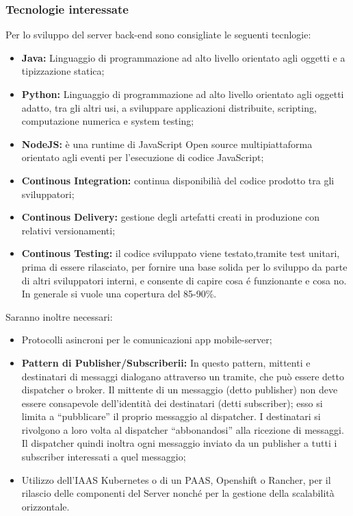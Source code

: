 	\subsubsection{Tecnologie interessate}
		Per lo sviluppo del server back-end sono consigliate le seguenti tecnlogie:
		\begin{itemize}
			\item \textbf{Java:} Linguaggio di programmazione ad alto livello orientato agli oggetti e a tipizzazione statica;
			\item \textbf{Python:} Linguaggio di programmazione ad alto livello orientato agli oggetti adatto, tra gli altri usi, a sviluppare applicazioni distribuite, scripting, computazione numerica e system testing;
			\item \textbf{NodeJS:} è una runtime di JavaScript Open source multipiattaforma orientato agli eventi per l'esecuzione di codice JavaScript;
			\item \textbf{Continous Integration:} continua disponibilià del codice prodotto tra gli sviluppatori;
			\item \textbf{Continous Delivery:} gestione degli artefatti creati in produzione con relativi versionamenti;
			\item \textbf{Continous Testing:} il codice sviluppato viene testato,tramite test unitari, prima di essere rilasciato, per fornire una base solida per lo sviluppo da parte di altri sviluppatori interni, e consente di capire cosa é funzionante e cosa no. In generale si vuole una copertura del 85-90\%.
		\end{itemize}
		Saranno inoltre necessari:
		\begin{itemize}
			\item Protocolli asincroni per le comunicazioni app mobile-server;
			\item \textbf{Pattern di Publisher/Subscriberii:} In questo pattern, mittenti e destinatari di messaggi dialogano attraverso un tramite, che può essere detto dispatcher o broker. Il mittente di un messaggio (detto publisher) non deve essere consapevole dell'identità dei destinatari (detti subscriber); esso si limita a ``pubblicare'' il proprio messaggio al dispatcher. I destinatari si rivolgono a loro volta al dispatcher ``abbonandosi'' alla ricezione di messaggi. Il dispatcher quindi inoltra ogni messaggio inviato da un publisher a tutti i subscriber interessati a quel messaggio;
			\item Utilizzo dell’IAAS Kubernetes o di un PAAS, Openshift o Rancher, per il rilascio delle componenti del Server nonché per la gestione della scalabilità orizzontale.
		\end{itemize}

